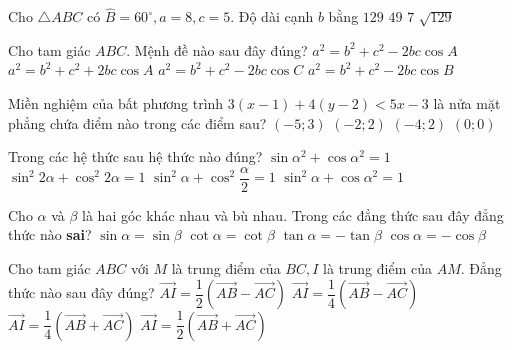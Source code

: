 \begin{ex}%
	Cho $\triangle ABC$ có $\widehat{B}=60^{\circ}, a=8, c=5$. Độ dài cạnh $b$ bằng
	\choice
	{$129$}
	{$49$}
	{\True $7$}
	{$\sqrt{129}$}
\end{ex}
\begin{ex}%
	Cho tam giác $ABC$. Mệnh đề nào sau đây đúng?
	\choice
	{\True $a^2=b^2+c^2-2 bc\cos A$}
	{$a^2=b^2+c^2+2 bc\cos A$}
	{$a^2=b^2+c^2-2 bc\cos C$}
	{$a^2=b^2+c^2-2 bc\cos B$}
\end{ex}
\begin{ex}%
	Miền nghiệm của bất phương trình $3(x-1)+4(y-2)<5 x-3$ là nửa mặt phẳng chứa điểm nào trong các điểm sau?
	\choice
	{$(-5 ; 3)$}
	{$(-2 ; 2)$}
	{$(-4 ; 2)$}
	{\True $(0 ; 0)$}
\end{ex}
\begin{ex}%
	Trong các hệ thức sau hệ thức nào đúng?
	\choice
	{$\sin\alpha^2+\cos \alpha^2=1$}
	{\True $\sin^2 2\alpha+\cos^2 2\alpha=1$}
	{$\sin^2\alpha+\cos^2\dfrac{\alpha}{2}=1$}
	{$\sin^2\alpha+\cos\alpha^2=1$}
\end{ex}
\begin{ex}%
	Cho $\alpha$ và $\beta$ là hai góc khác nhau và bù nhau. Trong các đẳng thức sau đây đẳng thức nào \textbf{sai}?
	\choice
	{$\sin \alpha=\sin \beta$}
	{\True $\cot \alpha=\cot \beta$}
	{$\tan \alpha=-\tan \beta$}
	{$\cos \alpha=-\cos \beta$}
\end{ex}
\begin{ex}%
	Cho tam giác $ABC$ với $M$ là trung điểm của $BC, I$ là trung điểm của $AM$. Đẳng thức nào sau đây đúng?
	\choice
	{$\overrightarrow{AI}=\dfrac{1}{2}(\overrightarrow{AB}-\overrightarrow{AC})$}
	{$\overrightarrow{AI}=\dfrac{1}{4}(\overrightarrow{AB}-\overrightarrow{AC})$}
	{\True $\overrightarrow{AI}=\dfrac{1}{4}(\overrightarrow{AB}+\overrightarrow{AC})$}
	{$\overrightarrow{AI}=\dfrac{1}{2}(\overrightarrow{AB}+\overrightarrow{AC})$}
\end{ex}
